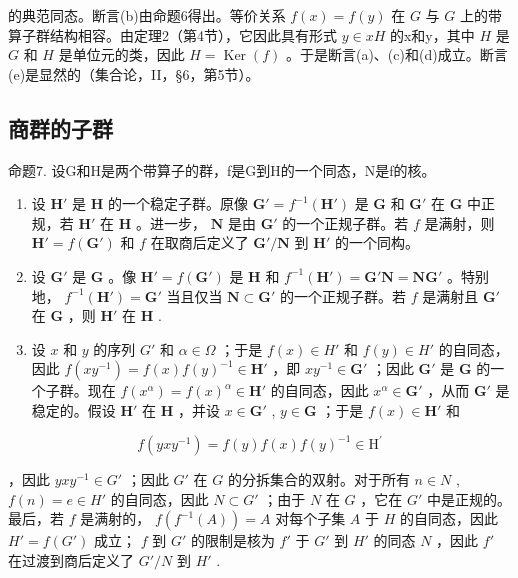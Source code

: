 的典范同态。断言(b)由命题6得出。等价关系 \(f(x) = f(y)\) 在 \(G\) 与 \(G\) 上的带算子群结构相容。由定理2（第4节），它因此具有形式 \(y \in xH\) 的x和y，其中 \(H\) 是 \(G\) 和 \(H\) 是单位元的类，因此 \(H = \operatorname{Ker}(f)\) 。于是断言(a)、(c)和(d)成立。断言(e)是显然的（集合论，II，§6，第5节）。

\subsection{商群的子群}

命题7. 设G和H是两个带算子的群，f是G到H的一个同态，N是f的核。

\begin{enumerate}
\def\labelenumi{(\alph{enumi})}
\item
  设 \(\mathbf{H}'\) 是 \(\mathbf{H}\) 的一个稳定子群。原像 \(\mathbf{G}' = f^{-1}(\mathbf{H}')\) 是 \(\mathbf{G}\) 和 \(\mathbf{G}'\) 在 \(\mathbf{G}\) 中正规，若 \(\mathbf{H}'\) 在 \(\mathbf{H}\) 。进一步， \(\mathbf{N}\) 是由 \(\mathbf{G}'\) 的一个正规子群。若 \(f\) 是满射，则 \(\mathbf{H}' = f(\mathbf{G}')\) 和 \(f\) 在取商后定义了 \(\mathbf{G}' / \mathbf{N}\) 到 \(\mathbf{H}'\) 的一个同构。
\item
  设 \(\mathbf{G}'\) 是 \(\mathbf{G}\) 。像 \(\mathbf{H}' = f(\mathbf{G}')\) 是 \(\mathbf{H}\) 和 \(f^{-1}(\mathbf{H}') = \mathbf{G}'\mathbf{N} = \mathbf{NG}'\) 。特别地， \(f^{-1}(\mathbf{H}') = \mathbf{G}'\) 当且仅当 \(\mathbf{N} \subset \mathbf{G}'\) 的一个正规子群。若 \(f\) 是满射且 \(\mathbf{G}'\) 在 \(\mathbf{G}\) ，则 \(\mathbf{H}'\) 在 \(\mathbf{H}\) .
\item
  设 \(x\) 和 \(y\) 的序列 \(G'\) 和 \(\alpha \in \Omega\) ；于是 \(f(x) \in H'\) 和 \(f(y) \in H'\) 的自同态，因此 \(f(xy^{-1}) = f(x)f(y)^{-1} \in \mathbf{H}'\) ，即 \(xy^{-1} \in \mathbf{G}'\) ；因此 \(\mathbf{G}'\) 是 \(\mathbf{G}\) 的一个子群。现在 \(f(x^{\alpha}) = f(x)^{\alpha} \in \mathbf{H}'\) 的自同态，因此 \(x^{\alpha} \in \mathbf{G}'\) ，从而 \(\mathbf{G}'\) 是稳定的。假设 \(\mathbf{H}'\) 在 \(\mathbf{H}\) ，并设 \(x \in \mathbf{G}'\) , \(y \in \mathbf{G}\) ；于是 \(f(x) \in \mathbf{H}'\) 和
\end{enumerate}

\[
f (y x y ^ {- 1}) = f (y) f (x) f (y) ^ {- 1} \in \mathrm{H} ^ {\prime}
\]

，因此 \(yxy^{-1} \in G'\) ；因此 \(G'\) 在 \(G\) 的分拆集合的双射。对于所有 \(n \in N\) , \(f(n) = e \in H'\) 的自同态，因此 \(N \subset G'\) ；由于 \(N\) 在 \(G\) ，它在 \(G'\) 中是正规的。最后，若 \(f\) 是满射的， \(f(f^{-1}(A)) = A\) 对每个子集 \(A\) 于 \(H\) 的自同态，因此 \(H' = f(G')\) 成立； \(f\) 到 \(G'\) 的限制是核为 \(f'\) 于 \(G'\) 到 \(H'\) 的同态 \(N\) ，因此 \(f'\) 在过渡到商后定义了 \(G'/N\) 到 \(H'\) .

